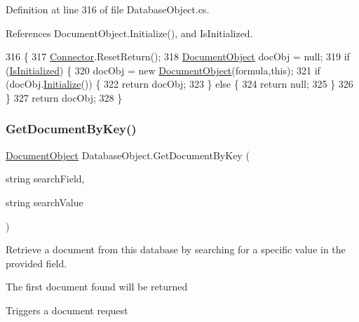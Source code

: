 Definition at line 316 of file Database\+Object.\+cs.



References Document\+Object.\+Initialize(), and Is\+Initialized.


\begin{DoxyCode}
316                                                                \{
317         \mbox{\hyperlink{class_connector}{Connector}}.ResetReturn();
318         \mbox{\hyperlink{class_document_object}{DocumentObject}} docObj = null;
319         \textcolor{keywordflow}{if} (\mbox{\hyperlink{class_database_object_a5fe036d32a30eb10d1b3f6a30263f740}{IsInitialized}}) \{
320             docObj = \textcolor{keyword}{new} \mbox{\hyperlink{class_document_object}{DocumentObject}}(formula,\textcolor{keyword}{this});
321             \textcolor{keywordflow}{if} (docObj.\mbox{\hyperlink{class_document_object_af4298d6cfbb9ea60643d9995309b73f1}{Initialize}}()) \{
322                 \textcolor{keywordflow}{return} docObj;
323             \} \textcolor{keywordflow}{else} \{
324                 \textcolor{keywordflow}{return} null;
325             \}
326         \}
327         \textcolor{keywordflow}{return} docObj;
328     \}
\end{DoxyCode}
\mbox{\label{class_database_object_a57bfc77d2754236cbcf6ac30a90da529}} 
\subsubsection{\texorpdfstring{Get\+Document\+By\+Key()}{GetDocumentByKey()}}
{\footnotesize\ttfamily \mbox{\hyperlink{class_document_object}{Document\+Object}} Database\+Object.\+Get\+Document\+By\+Key (\begin{DoxyParamCaption}\item[{string}]{search\+Field,  }\item[{string}]{search\+Value }\end{DoxyParamCaption})}



Retrieve a document from this database by searching for a specific value in the provided field. 

The first document found will be returned

Triggers a document request

